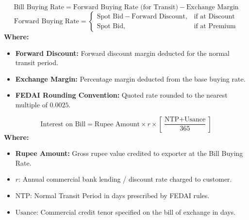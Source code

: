 \begin{formulabox}
\begin{equation*}
    \text{Bill Buying Rate} = \text{Forward Buying Rate (for Transit)} - \text{Exchange Margin}
\end{equation*}
\begin{equation*}
    \text{Forward Buying Rate} = \begin{cases} 
        \text{Spot Bid} - \text{Forward Discount}, & \text{if at Discount} \\
        \text{Spot Bid}, & \text{if at Premium}
    \end{cases}
\end{equation*}
\textbf{Where:}
\begin{itemize}[leftmargin=*, noitemsep]
    \item \textbf{Forward Discount:} Forward discount margin deducted for the normal transit period.
    \item \textbf{Exchange Margin:} Percentage margin deducted from the base buying rate.
    \item \textbf{FEDAI Rounding Convention:} Quoted rate rounded to the nearest multiple of $0.0025$.
\end{itemize}
\end{formulabox}

\begin{formulabox}
\begin{equation*}
    \text{Interest on Bill} = \text{Rupee Amount} \times r \times \left[ \frac{\text{NTP} + \text{Usance}}{365} \right]
\end{equation*}
\textbf{Where:}
\begin{itemize}[leftmargin=*, noitemsep]
    \item \textbf{Rupee Amount:} Gross rupee value credited to exporter at the Bill Buying Rate.
    \item $r$: Annual commercial bank lending / discount rate charged to customer.
    \item $\text{NTP}$: Normal Transit Period in days prescribed by FEDAI rules.
    \item $\text{Usance}$: Commercial credit tenor specified on the bill of exchange in days.
\end{itemize}
\end{formulabox}

